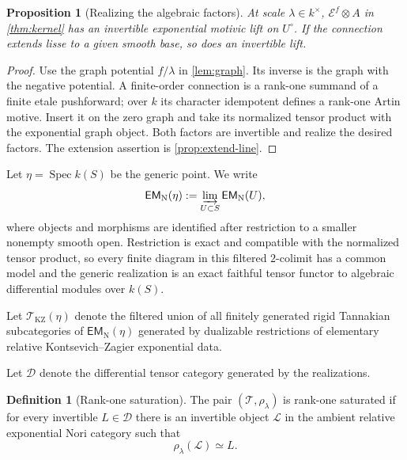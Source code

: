 \documentclass[11pt]{article}
\numberwithin{equation}{section}
\newtheorem{proposition}[proposition]{Proposition}
\theoremstyle{definition}
\newtheorem{definition}[definition]{Definition}
\theoremstyle{remark}
\newcommand{\Ecal}{\mathcal E}
\newcommand{\Tcal}{\mathcal T}
\newcommand{\Dcal}{\mathcal D}
\newcommand{\Spec}{\operatorname{Spec}}
\newcommand{\EMN}{\mathsf{EM}_{\mathrm N}}
\begin{document}
\begin{proposition}[Realizing the algebraic factors]\label{prop:realize-line}
At scale $\lambda\in k^\times$, $\Ecal^f\otimes A$ in
\cref{thm:kernel} has an invertible exponential motivic lift on $U^\circ$.
If the connection extends lisse to a given smooth base, so does an
invertible lift.
\end{proposition}
\begin{proof}
Use the graph potential $f/\lambda$ in \cref{lem:graph}. Its inverse
is the graph with the negative potential. A finite-order connection is a
rank-one summand of a finite etale pushforward; over $k$ its character
idempotent defines a rank-one Artin motive. Insert it on the zero graph
and take its normalized tensor product with the exponential graph object.
Both factors are invertible and realize the desired factors. The extension
assertion is \cref{prop:extend-line}.
\end{proof}

Let $\eta=\Spec k(S)$ be the generic point.  We write
\[
  \EMN(\eta):=\varinjlim_{U\subset S}\EMN(U),
\]
where objects and morphisms are identified after restriction to a smaller
nonempty smooth open.  Restriction is exact and compatible with the normalized tensor product, so every
finite diagram in this filtered $2$-colimit has a common model and the generic
realization is an exact faithful tensor functor to algebraic differential
modules over $k(S)$.

Let $\Tcal_{\mathrm{KZ}}(\eta)$ denote the filtered union of all finitely
generated rigid Tannakian subcategories of $\EMN(\eta)$ generated by
dualizable restrictions of elementary relative Kontsevich--Zagier exponential
data.


Let $\Dcal$ denote the differential tensor category generated by the realizations.

\begin{definition}[Rank-one saturation]\label{def:RS}
The pair $(\Tcal,\rho_\lambda)$ is rank-one saturated if for every invertible
$L\in\Dcal$ there is an invertible object $\mathcal L$ in the ambient
relative exponential Nori category such that
\[
  \rho_\lambda(\mathcal L)\simeq L.
\]
\end{definition}
\end{document}
